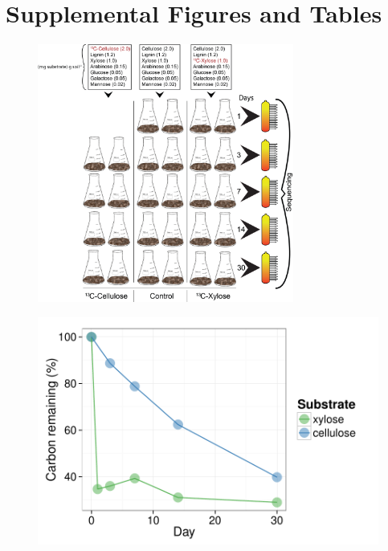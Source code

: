 \thispagestyle{empty}


\section{Supplemental Figures and Tables}

\begin{figure}[H]
	\begin{center}
	\centerline{\includegraphics[width=0.75\textwidth]{figures/20150320methods_conceptual/20150320methods_conceptual.png}}
	\caption[Experimental Set Up]{\protect}\label{fig:setup}
        \end{center}
\end{figure}

\begin{figure}[H]
	\begin{center}
	\centerline{\includegraphics[width=11.4cm]{figures/13C_chart/13C_chart.pdf}}
	\caption{\protect}\label{fig:13C}
        \end{center}
\end{figure}

